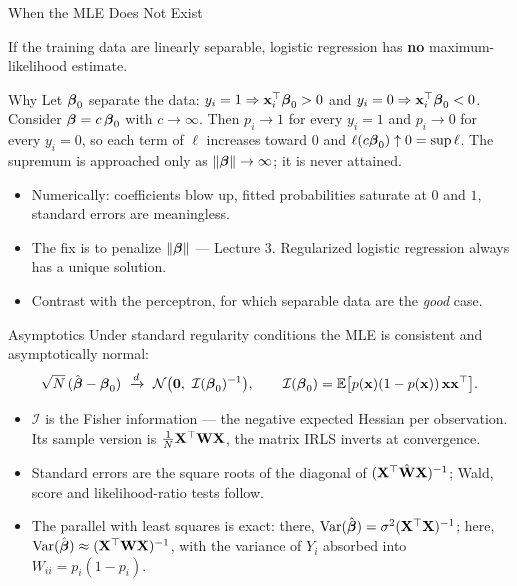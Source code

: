 \documentclass[11pt,aspectratio=169]{beamer}
\begin{document}
\begin{frame}{When the MLE Does Not Exist}
\begin{caution}
If the training data are linearly separable, logistic regression has \textbf{no} maximum-likelihood
estimate.
\end{caution}
\begin{derivation}{Why}
Let $\boldsymbol{\beta}_0$ separate the data: $y_i=1\Rightarrow\mathbf{x}_i^{\top}\boldsymbol{\beta}_0>0$ and $y_i=0\Rightarrow\mathbf{x}_i^{\top}\boldsymbol{\beta}_0<0$.
Consider $\boldsymbol{\beta}=c\,\boldsymbol{\beta}_0$ with $c\to\infty$. Then $p_i\to1$ for every $y_i=1$ and $p_i\to0$ for every
$y_i=0$, so each term of $\ell$ increases toward $0$ and $\ell(c\boldsymbol{\beta}_0)\uparrow0=\sup\ell$.
The supremum is approached only as $\left\lVert \boldsymbol{\beta} \right\rVert\to\infty$; it is never attained.
\end{derivation}
\begin{itemize}
  \item Numerically: coefficients blow up, fitted probabilities saturate at $0$ and $1$, standard errors are meaningless.
  \item The fix is to penalize $\left\lVert \boldsymbol{\beta} \right\rVert$ --- Lecture 3. Regularized logistic regression always has a unique solution.
  \item Contrast with the perceptron, for which separable data are the \emph{good} case.
\end{itemize}
\end{frame}

\begin{frame}{Asymptotics}
Under standard regularity conditions the MLE is consistent and asymptotically normal:
\[
\sqrt N\,(\hat\vbeta-\vbeta_0)\ \xrightarrow{d}\ \Ncal\bigl(\vzero,\ \mathcal I(\vbeta_0)\inv\bigr),\qquad
\mathcal I(\vbeta_0)=\E\bigl[p(\vx)(1-p(\vx))\,\vx\vx\T\bigr].
\]
\begin{itemize}
  \item $\mathcal I$ is the Fisher information --- the negative expected Hessian per observation. Its sample
        version is $\tfrac1N\mathbf{X}^{\top}\mathbf{W}\mathbf{X}$, the matrix IRLS inverts at convergence.
  \item Standard errors are the square roots of the diagonal of $(\mathbf{X}^{\top}\hat{\mathbf{W}}\mathbf{X})^{-1}$; Wald, score and
        likelihood-ratio tests follow.
  \item The parallel with least squares is exact: there, $\operatorname{Var}(\hat{\boldsymbol{\beta}})=\sigma^2(\mathbf{X}^{\top}\mathbf{X})^{-1}$; here,
        $\operatorname{Var}(\hat{\boldsymbol{\beta}})\approx(\mathbf{X}^{\top}\mathbf{W}\mathbf{X})^{-1}$, with the variance of $Y_i$ absorbed into $W_{ii}=p_i(1-p_i)$.
\end{itemize}
\end{frame}
\end{document}
